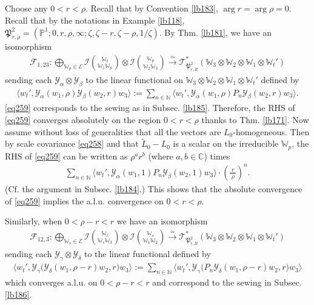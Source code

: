 \documentclass[11pt,b5paper,notitlepage]{article}
\theoremstyle{definition}
\theoremstyle{plain}
\newcommand{\fk}{\mathfrak}
\newcommand{\mc}{\mathcal}
\newcommand{\wtd}{\widetilde}
\newcommand{\bigbk}[1]{\big\langle {#1}\big\rangle}
\newcommand{\scr}{\mathscr}
\newcommand{\Wbb}{\mathbb W}
\newcommand{\Cbb}{\mathbb C}
\newcommand{\Nbb}{\mathbb N}
\newcommand{\Pbb}{\mathbb P}
\numberwithin{equation}{section}
\begin{document}
\subsection{}


Choose any $0<r<\rho$. Recall that by Convention \ref{lb183}, $\arg r=\arg\rho=0$. Recall that by the notations in Example \ref{lb118}, $\fk P^2_{r,\rho}=(\Pbb^1;0,r,\rho,\infty;\zeta,\zeta-r,\zeta-\rho,1/\zeta)$. By Thm. \ref{lb181}, we have an isomorphism
\begin{gather*}
\mc F_{1,23}:\bigoplus_{\Wbb_p\in\mc E}\mc I{\Wbb_t\choose \Wbb_1\Wbb_p}\otimes \mc I{\Wbb_p\choose\Wbb_2\Wbb_3}\xrightarrow{\simeq}\scr T_{\fk P^2_{r,R}}^*(\Wbb_3\otimes\Wbb_2\otimes\Wbb_1\otimes\Wbb_t')
\end{gather*}
sending each $\mc Y_\alpha\otimes\mc Y_\beta$ to the linear functional on $\Wbb_3\otimes\Wbb_2\otimes\Wbb_1\otimes\Wbb_t'$ defined by
\begin{align}\label{eq259}
\bigbk{w_t',\mc Y_\alpha(w_1,\rho)\mc Y_\beta(w_2,r)w_3}:=\sum_{n\in\Nbb}\bigbk{w_t',\mc Y_\alpha(w_1,\rho)P_n\mc Y_\beta(w_2,r)w_3}.
\end{align}
\eqref{eq259} corresponds to the sewing as in Subsec. \ref{lb185}. Therefore, the RHS of \eqref{eq259} converges absolutely on the region $0<r<\rho$ thanks to Thm. \ref{lb171}. Now assume without loss of generalities that all the vectors are $L_0$-homogeneous. Then by scale covariance \eqref{eq258} and that $\wtd L_0-L_0$ is a scalar on the irreducible $\Wbb_p$, the RHS of \eqref{eq259} can be written as $\rho^ar^b$ (where $a,b\in\Cbb$) times
\begin{align*}
\sum_{n\in\Nbb}\bigbk{w_t',\mc Y_\alpha(w_1,1)P_n\mc Y_\beta(w_2,1)w_3}\cdot \left(\frac {~r~}{~\rho~}\right)^n.
\end{align*}
(Cf. the argument in Subsec. \ref{lb184}.) This shows that the absolute convergence of \eqref{eq259} implies the a.l.u. convergence on $0<r<\rho$.



Similarly, when $0<\rho-r<r$ we have an isomorphism
\begin{align*}
\mc F_{12,3}:\bigoplus_{\Wbb_s\in\mc E}\mc I{\Wbb_t\choose \Wbb_s\Wbb_3}\otimes\mc I{\Wbb_s\choose \Wbb_1\Wbb_2}\xrightarrow{\simeq}\scr T_{\fk P^2_{r,R}}^*(\Wbb_3\otimes\Wbb_2\otimes\Wbb_1\otimes\Wbb_t')
\end{align*}
sending each $\mc Y_\gamma\otimes\mc Y_\delta$ to the linear functional defined by
\begin{align}
\bigbk{w_t',\mc Y_\gamma\big(\mc Y_\delta(w_1,\rho-r)w_2,r\big)w_3}:=\sum_{n\in\Nbb}\bigbk{w_t',\mc Y_\gamma\big(P_n\mc Y_\delta(w_1,\rho-r)w_2,r\big)w_3}\label{eq261}
\end{align}
which converges a.l.u. on $0<\rho-r<r$ and correspond to the sewing in Subsec. \ref{lb186}.
\end{document}
